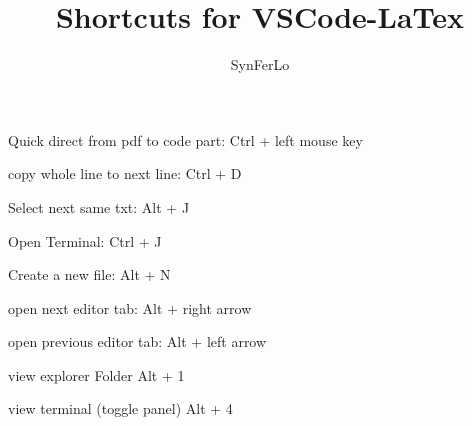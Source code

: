 \documentclass[12pt]{article}
\title{Shortcuts for VSCode-LaTex}
\author{SynFerLo}
\begin{document}
    \maketitle
    \newpage


    Quick direct from pdf to code part: Ctrl + left mouse key

    copy whole line to next line:       Ctrl + D

    Select next same txt:               Alt + J

    Open Terminal:                      Ctrl + J

    Create a new file:                  Alt + N

    open next editor tab:               Alt + right arrow

    open previous editor tab:           Alt + left arrow

    view explorer Folder                Alt + 1

    view terminal (toggle panel)        Alt + 4
\end{document}

